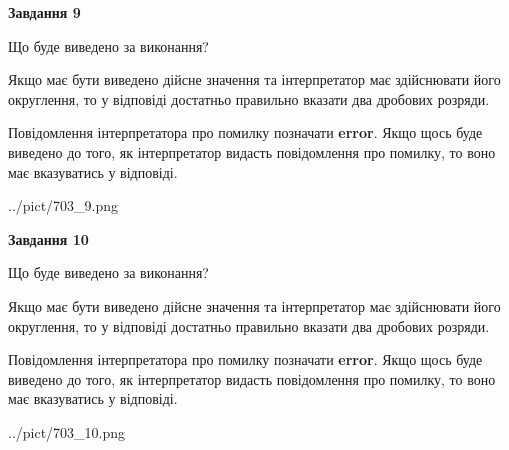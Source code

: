 \documentclass[12pt, ukrainian]{article}
\begin{document}
{\begin {Large}
{\begin {center}\textbf{Завдання 9}\end {center}}\par
Що буде виведено за виконання? \par

Якщо має бути виведено дійсне значення та інтерпретатор має здійснювати його округлення, 
то у відповіді достатньо правильно вказати два дробових розряди.

Повідомлення інтерпретатора про помилку позначати \textbf{error}.
Якщо щось буде виведено до того, як інтерпретатор видасть повідомлення про помилку, 
то воно має вказуватись у відповіді. \par

\begin{center}
	{../pict/703_9.png}
\end{center}
\newpage

{\begin {center}\textbf{Завдання 10}\end {center}}\par
Що буде виведено за виконання? \par

Якщо має бути виведено дійсне значення та інтерпретатор має здійснювати його округлення, 
то у відповіді достатньо правильно вказати два дробових розряди.

Повідомлення інтерпретатора про помилку позначати \textbf{error}.
Якщо щось буде виведено до того, як інтерпретатор видасть повідомлення про помилку, 
то воно має вказуватись у відповіді. \par

\begin{center}
	{../pict/703_10.png}
\end{center}
\newpage

\end {Large}}
\end{document}
